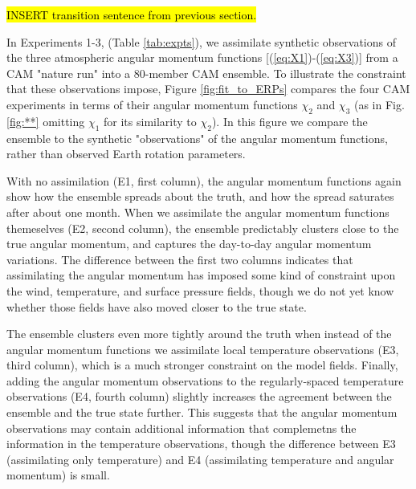\hl{INSERT transition sentence from previous section.}

In Experiments 1-3, (Table \ref{tab:expts}), we assimilate synthetic observations of the three atmospheric angular momentum functions [(\ref{eq:X1})-(\ref{eq:X3})] from a CAM "nature run" into a 80-member CAM ensemble. 
To illustrate the constraint that these observations impose, Figure \ref{fig:fit_to_ERPs} compares the four CAM experiments in terms of their angular momentum functions $\chi_2$ and $\chi_3$ (as in Fig. \ref{fig:**} omitting $\chi_1$ for its similarity to $\chi_2$).  
In this figure we compare the ensemble to the synthetic "observations" of the angular momentum functions, rather than observed Earth rotation parameters. 

With no assimilation (E1, first column), the angular momentum functions again show how the ensemble spreads about the truth, and how the spread saturates after about one month.
When we assimilate the angular momentum functions themeselves (E2, second column), the ensemble predictably clusters close to the true angular momentum, and captures the day-to-day angular momentum variations. 
The difference between the first two columns indicates that assimilating the angular momentum has imposed some kind of constraint upon the wind, temperature, and surface pressure fields, though we do not yet know whether those fields have also moved closer to the true state. 

The ensemble clusters even more tightly around the truth when instead of the angular momentum functions we assimilate local temperature observations (E3, third column), which is a much stronger constraint on the model fields. 
Finally, adding the angular momentum observations to the regularly-spaced temperature observations (E4, fourth column) slightly increases the agreement between the ensemble and the true state further.  
This suggests that the angular momentum observations may contain additional information that complemetns the information in the temperature observations, though the difference between E3 (assimilating only temperature) and E4 (assimilating temperature and angular momentum) is small.  
